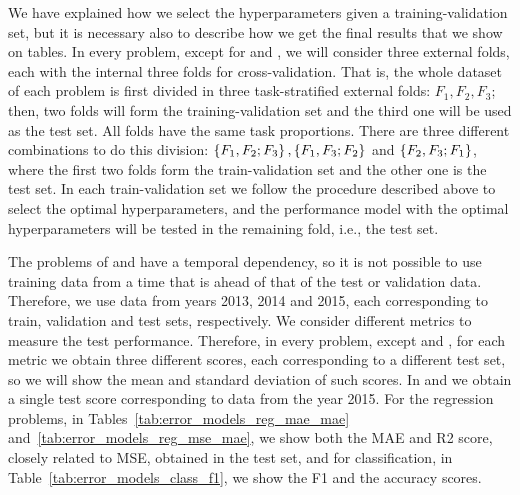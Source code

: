 We have explained how we select the hyperparameters given a training-validation set, but it is necessary also to describe how we get the final results that we show on tables.
In every problem, except for  and , we will consider three external folds, each with the internal three folds for cross-validation. That is, the whole dataset of each problem is first divided in three task-stratified external folds: $F_1, F_
2, F_3$; then, two folds will form the training-validation set and the third one will be used as the test set. All folds have the same task proportions. There are three different combinations to do this division: $\left\{F_1, F_2; F_3\right\}, \left\{F_1, F_3; F_2\right\}$ and $\left\{F_2, F_3; F_1\right\}$, where the first two folds form the train-validation set and the other one is the test set.
%
In each train-validation set we follow the procedure described above to select the optimal hyperparameters, and the performance model with the optimal hyperparameters will be tested in the remaining fold, i.e., the test set.
%

The problems of  and  have a temporal dependency, so it is not possible to use training data from a time that is ahead of that of the test or validation data. Therefore, we use data from years 2013, 2014 and 2015, each corresponding to train, validation and test sets, respectively.
%
We consider different metrics to measure the test performance. Therefore, in every problem, except  and , for each metric we obtain three different scores, each corresponding to a different test set, so we will show the mean and standard deviation of such scores. In  and  we obtain a single test score corresponding to data from the year 2015.
% 
For the regression problems, in Tables~\ref{tab:error_models_reg_mae_mae} and~\ref{tab:error_models_reg_mse_mae}, we show both the MAE and R2 score, closely related to MSE, obtained in the test set, and for classification, in Table~\ref{tab:error_models_class_f1}, we show the F1 and the accuracy scores.
%







